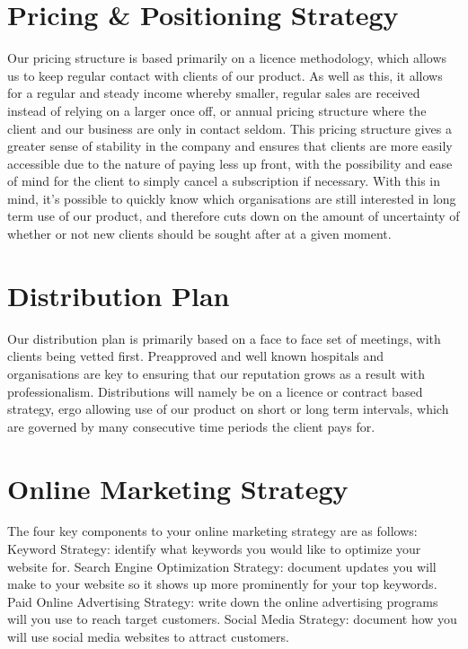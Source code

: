 \documentclass{article}
\begin{document}
\section{Pricing & Positioning Strategy}
Our pricing structure is based primarily on a licence methodology, which allows us to keep regular contact with clients of our product. As well as this, it allows for a regular and steady income whereby smaller, regular sales are received instead of relying on a larger once off, or annual pricing structure where the client and our business are only in contact seldom. This pricing structure gives a greater sense of stability in the company and ensures that clients are more easily accessible due to the nature of paying less up front, with the possibility and ease of mind for the client to simply cancel a subscription if necessary. With this in mind, it’s possible to quickly know which organisations are still interested in long term use of our product, and therefore cuts down on the amount of uncertainty of whether or not new clients should be sought after at a given moment.




\section{Distribution Plan}
Our distribution plan is primarily based on a face to face set of meetings, with clients being vetted first. Preapproved and well known hospitals and organisations are key to ensuring that our reputation grows as a result with professionalism. Distributions will namely be on a licence or contract based strategy, ergo allowing use of our product on short or long term intervals, which are governed by many consecutive time periods the client pays for.






\section{Online Marketing Strategy}

The four key components to your online marketing strategy are as follows:
Keyword Strategy: identify what keywords you would like to optimize your website for.
Search Engine Optimization Strategy: document updates you will make to your website so it shows up more prominently for your top keywords.
Paid Online Advertising Strategy: write down the online advertising programs will you use to reach target customers.
Social Media Strategy: document how you will use social media websites to attract customers.
\end{document}
